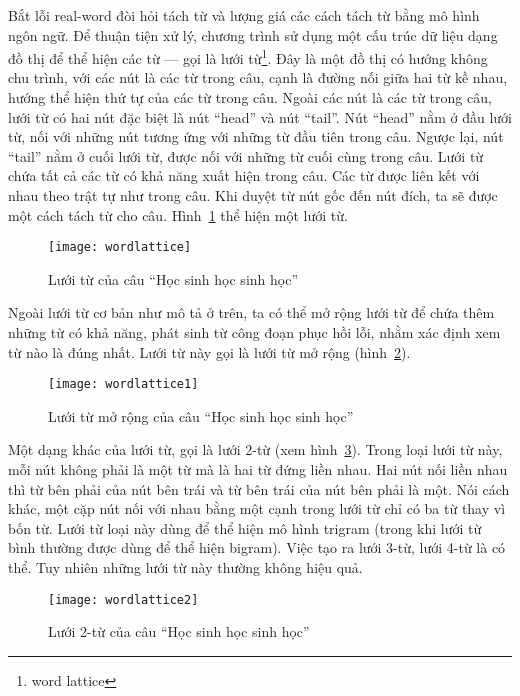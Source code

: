 \documentclass[a4paper,oneside,14pt]{extbook} %
\begin{document}
Bắt lỗi real-word đòi hỏi tách từ và lượng giá các cách tách từ bằng
mô hình ngôn ngữ. Để thuận tiện xử lý, chương trình sử dụng một cấu
trúc dữ liệu dạng đồ thị để thể hiện các từ --- gọi là lưới
từ\footnote{word lattice}. Đây là một đồ thị có hướng không chu trình,
với các nút là các từ trong câu, cạnh là đường nối giữa hai từ kề
nhau, hướng thể hiện thứ tự của các từ trong câu. Ngoài các nút là các
từ trong câu, lưới từ có hai nút đặc biệt là nút ``head'' và nút
``tail''. Nút ``head'' nằm ở đầu lưới từ, nối với những nút tương ứng
với những từ đầu tiên trong câu. Ngược lại, nút ``tail'' nằm ở cuối
lưới từ, được nối với những từ cuối cùng trong câu.
Lưới từ chứa tất cả 
các từ có khả năng xuất hiện trong câu. Các từ được liên kết với nhau
theo trật tự như trong câu. Khi duyệt từ nút gốc đến nút đích, ta sẽ
được một cách tách từ cho câu. Hình~\ref{fig:wordlattice} thể hiện một
lưới từ.

\begin{figure}[htbp]
  \centering
  \texttt{[image: wordlattice]}
  \caption{Lưới từ của câu ``Học sinh học sinh học''}
  \label{fig:wordlattice}
\end{figure}

Ngoài lưới từ cơ bản như mô tả ở trên, ta có thể mở rộng lưới từ để
chứa thêm những từ có khả năng, phát sinh từ công đoạn phục hồi lỗi,
nhằm xác định xem từ nào là đúng nhất. Lưới từ này gọi là lưới từ mở
rộng (hình~\ref{fig:wordlattice1}). 

\begin{figure}[htbp]
  \centering
  \texttt{[image: wordlattice1]}
  \caption{Lưới từ mở rộng của câu ``Học sinh học sinh học''}
  \label{fig:wordlattice1}
\end{figure}

Một dạng khác của lưới từ, gọi là lưới 2-từ  (xem
hình~\ref{fig:wordlattice2}). Trong loại lưới từ này, 
mỗi nút không phải là một từ mà là hai từ đứng liền nhau. Hai nút nối
liền nhau thì từ bên phải của nút bên trái và từ bên trái của nút bên
phải là một. Nói cách khác, một cặp nút nối với nhau bằng một cạnh
trong lưới từ chỉ có ba từ thay vì bốn từ. Lưới từ loại này dùng để
thể hiện mô hình trigram (trong khi lưới từ bình thường được dùng để
thể hiện bigram). Việc tạo ra lưới 3-từ, lưới 4-từ là có thể. Tuy
nhiên những lưới từ này thường không hiệu quả. 

\begin{figure}[htbp]
  \centering
  \texttt{[image: wordlattice2]}
  \caption{Lưới 2-từ của câu ``Học sinh học sinh học''}
  \label{fig:wordlattice2}
\end{figure}
\end{document}
